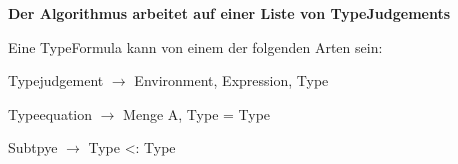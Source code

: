{
  
    \textbf{Der Algorithmus arbeitet auf einer Liste von TypeJudgements}
    
    \begin{itemgroup}{Eine TypeFormula kann von einem der folgenden Arten sein:}
    \item Typejudgement $\to$  	Environment, Expression, Type
    \item Typeequation 	$\to$	Menge A, Type = Type
    \item Subtpye	$\to$	Type <: Type
  \end{itemgroup}
}